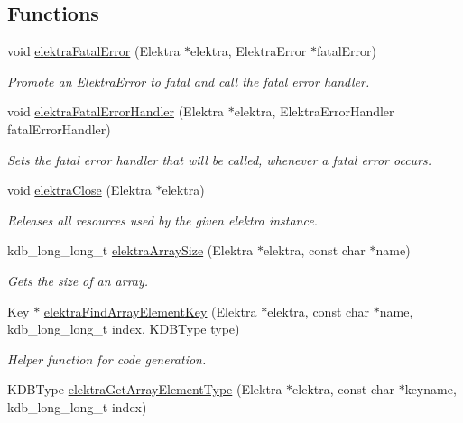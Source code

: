 \subsection*{Functions}
\begin{DoxyCompactItemize}
\item 
void \hyperlink{group__highlevel_ga57d87ff6defe4db402b772ab2a0025f9}{elektra\+Fatal\+Error} (Elektra $\ast$elektra, Elektra\+Error $\ast$fatal\+Error)
\begin{DoxyCompactList}\small\item\em Promote an Elektra\+Error to fatal and call the fatal error handler. \end{DoxyCompactList}\item 
void \hyperlink{group__highlevel_ga496441e9e1dd80ed14a239dfc4c08c40}{elektra\+Fatal\+Error\+Handler} (Elektra $\ast$elektra, Elektra\+Error\+Handler fatal\+Error\+Handler)
\begin{DoxyCompactList}\small\item\em Sets the fatal error handler that will be called, whenever a fatal error occurs. \end{DoxyCompactList}\item 
void \hyperlink{group__highlevel_ga9b688b7250e5f9d8ea6701cc2cc269af}{elektra\+Close} (Elektra $\ast$elektra)
\begin{DoxyCompactList}\small\item\em Releases all resources used by the given elektra instance. \end{DoxyCompactList}\item 
kdb\+\_\+long\+\_\+long\+\_\+t \hyperlink{group__highlevel_gaf0413286c6faebdc951b739924111909}{elektra\+Array\+Size} (Elektra $\ast$elektra, const char $\ast$name)
\begin{DoxyCompactList}\small\item\em Gets the size of an array. \end{DoxyCompactList}\item 
Key $\ast$ \hyperlink{group__highlevel_gac822ee43ab690e671ed47129a8b47cdc}{elektra\+Find\+Array\+Element\+Key} (Elektra $\ast$elektra, const char $\ast$name, kdb\+\_\+long\+\_\+long\+\_\+t index, K\+D\+B\+Type type)
\begin{DoxyCompactList}\small\item\em Helper function for code generation. \end{DoxyCompactList}\item 
K\+D\+B\+Type \hyperlink{group__highlevel_ga295b4302c968c7285bc4dc1307c0e2cf}{elektra\+Get\+Array\+Element\+Type} (Elektra $\ast$elektra, const char $\ast$keyname, kdb\+\_\+long\+\_\+long\+\_\+t index)

\end{DoxyCompactItemize}

